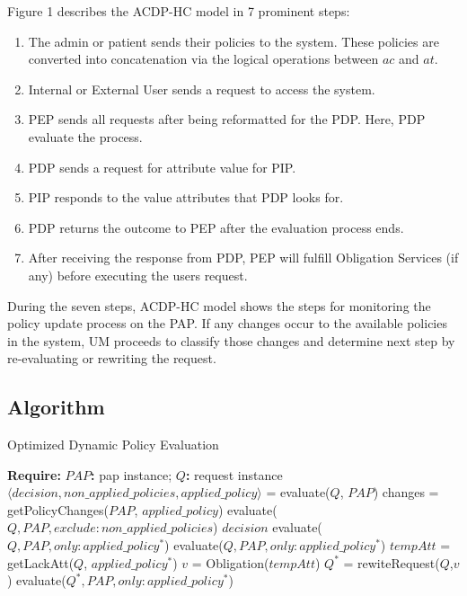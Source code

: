 \documentclass[conference]{IEEEtran}
\begin{document}
Figure 1 describes the ACDP-HC model in 7 prominent steps:
\begin{enumerate}
	\item The admin or patient sends their policies to the system. These policies are converted into concatenation via the logical operations between $ac$ and $at$.
	\item Internal or External User sends a request to access the system. 
	\item PEP sends all requests after being reformatted for the PDP. Here, PDP evaluate the process.
	\item PDP sends a request for attribute value for PIP.
	\item PIP responds to the value attributes that PDP looks for.
	\item PDP returns the outcome to PEP after the evaluation process ends.
	\item	After receiving the response from PDP, PEP will fulfill Obligation Services (if any) before executing the users request.
\end{enumerate}

During the seven steps, ACDP-HC model shows the steps for monitoring the policy update process on the PAP. 
If any changes occur to the available policies in the system, UM proceeds to classify those changes and determine next step by re-evaluating or rewriting the request. 

\subsection{Algorithm}\label{Al}

\begin{algorithm}
	\caption{Optimized Dynamic Policy Evaluation}
	\label{alg:optimized}
	\fontsize{9pt}{12pt}\selectfont
	\begin{algorithmic}[1]
		\item \textbf{Require:} \textbf{$PAP$:} pap instance; \textbf{$Q$:} request instance\\
		$\langle decision, non\_applied\_policies, applied\_policy \rangle$ = evaluate($Q$, $PAP$)
		\State changes = getPolicyChanges($PAP$, $applied\_policy$)
				\State \Return evaluate($Q, PAP, exclude: non\_applied\_policies$)
			\EndCase
				\State \Return $decision$
			\EndCase
				\State \Return evaluate($Q, PAP, only: applied\_policy^*$)
				\State \Return evaluate($Q, PAP, only: applied\_policy^*$)
				\State $tempAtt$ = getLackAtt($Q$, $applied\_policy^*$)
				\State  $v$ = Obligation($tempAtt$)
				\State  $Q^*$ = rewiteRequest($Q$,$v$)
				\State \Return evaluate($Q^*, PAP, only: applied\_policy^*$)
				\EndIf
			\EndCase
		\EndSwitch
	\end{algorithmic}
\end{algorithm}
\end{document}
